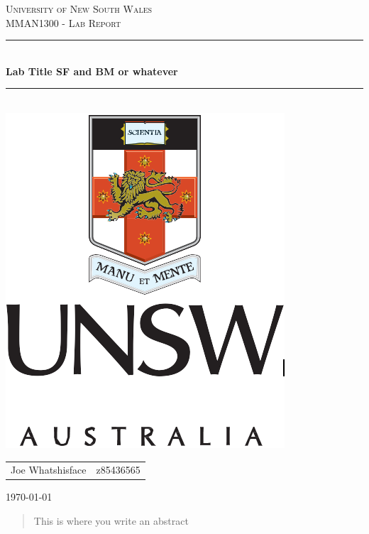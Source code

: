 \documentclass[12pt]{article}
\begin{document}
\begin{titlepage}

\newcommand{\HRule}{\rule{\linewidth}{0.5mm}}
\center 

\textsc{\LARGE University of New South Wales}\\[1.5cm] 
\textsc{\Large MMAN1300 - Lab Report}\\[0.5cm] 

\HRule \\[0.4cm]
{ \huge \bfseries Lab Title SF and BM or whatever}\\[0.4cm] 
\HRule \\[1.5cm]

\includegraphics[scale=1.3]{logo.PNG}\\[1cm]

\begin{center}
\begin{tabular}{ c   |   c } 
 Joe Whatshisface & z85436565
\end{tabular}
\end{center}

\vfill
{\large \today}\\[1cm] 
\vfill 

\end{titlepage}

\begin{abstract}
This is where you write an abstract
\end{abstract}
\end{document}
